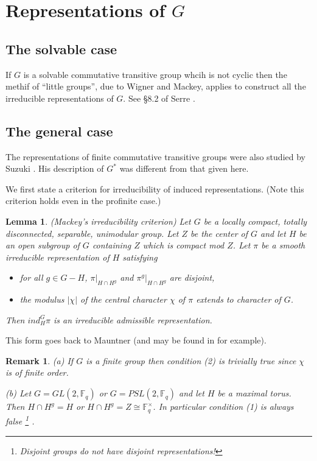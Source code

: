 \documentclass[amsfonts,12pt]{article}
\newtheorem{lemma}[theorem]{Lemma}
\newtheorem{remark}{Remark}
\def\fff{\mathbb{F}}
\begin{document}
\section{Representations of $G$}

\subsection{The solvable case}

If $G$ is a solvable commutative transitive group whcih is not cyclic
then the methif of ``little groups'', due to 
Wigner and Mackey, applies to construct all
the irreducible representations of $G$.
See \S 8.2 of Serre \cite{Se}.

\subsection{The general case}

The representations of finite commutative transitive groups
were also studied by Suzuki \cite{S}. His description of 
$G^*$ was different from that given here.

We first state a criterion for irreducibility
of induced representations. (Note this criterion holds even in the 
profinite case.)

\begin{lemma} (Mackey's irreducibility criterion)
Let $G$ be a locally compact, totally disconnected, separable,
unimodular group. Let $Z$ be the center of $G$ and let $H$ be an open
subgroup of $G$ containing $Z$ which is compact mod $Z$. Let
$\pi$ be a smooth irreducible representation of $H$ satisfying
\begin{itemize}
\item[(1)]
for all $g\in G-H$, $\pi|_{H\cap H^g}$ and
$\pi^g|_{H\cap H^g}$ are disjoint,
\item[(2)]
the modulus $|\chi|$ of the central character $\chi$ of
$\pi$ extends to character of $G$.
\end{itemize}
Then $ind_H^G\pi$ is an irreducible admissible representation. 
\end{lemma}

This form goes back to Mauntner (and may be found in \cite{J}
for example).
 
\begin{remark}
(a) If $G$ is a finite group then condition
(2) is trivially true since $\chi$ is of finite order.

(b) Let $G=GL(2,\fff_q)$ or $G=PSL(2,\fff_q)$ 
and let $H$ be a maximal torus. Then
$H\cap H^g=H$ or $H\cap H^g=Z\cong \fff_q^\times$. In particular
condition (1) is always false
\footnote{Disjoint groups {\it do not} have disjoint representations!
}
.

\end{remark}
\end{document}
